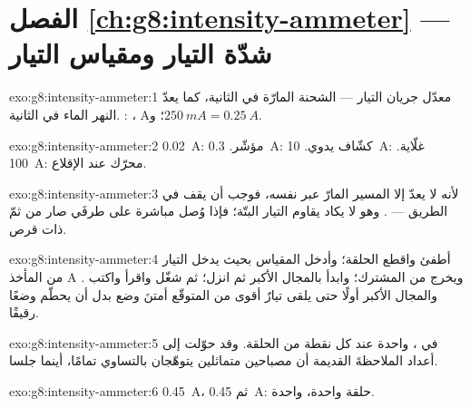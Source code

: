 \section*{الفصل \ref{ch:g8:intensity-ammeter} --- شدّة التيار ومقياس التيار}

\begin{solution}{exo:g8:intensity-ammeter:1}
معدّل جريان التيار --- الشحنة المارّة في الثانية، كما يعدّ
النهر الماء في الثانية. : ، \unit{A}؛
و$\qty{250}{mA} = \qty{0.25}{A}$.
\end{solution}

\begin{solution}{exo:g8:intensity-ammeter:2}
\qty{0.02}{A}:  مؤشّر. \qty{0.3}{A}:  كشّاف يدوي.
\qty{10}{A}: غلّاية. \qty{100}{A}: محرّك عند الإقلاع.
\end{solution}

\begin{solution}{exo:g8:intensity-ammeter:3}
لأنه لا يعدّ إلا المسير المارّ عبر نفسه، فوجب أن يقف في الطريق
--- . وهو لا يكاد يقاوم التيار البتّة؛ فإذا وُصل
مباشرة على طرفَي  صار من ثمّ  ذات قرص.
\end{solution}

\begin{solution}{exo:g8:intensity-ammeter:4}
أطفئ واقطع الحلقة؛ وأدخل المقياس بحيث يدخل التيار من المأخذ
\unit{A} ويخرج من المشترك؛ وابدأ بالمجال الأكبر ثم انزل؛ ثم
شغّل واقرأ واكتب . والمجال الأكبر أولًا حتى يلقى تيارٌ
أقوى من المتوقّع أمتنَ وضع بدل أن يحطّم وضعًا رقيقًا.
\end{solution}

\begin{solution}{exo:g8:intensity-ammeter:5}
في ،  واحدة عند كل نقطة من الحلقة. وقد
حوّلت إلى أعداد الملاحظةَ القديمة أن مصباحين متماثلين  يتوهّجان بالتساوي تمامًا، أينما جلسا.
\end{solution}

\begin{solution}{exo:g8:intensity-ammeter:6}
\qty{0.45}{A}، ثم \qty{0.45}{A}: حلقة واحدة،  واحدة.
\end{solution}

